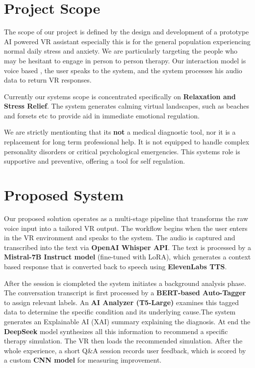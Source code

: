 \section{Project Scope}

The scope of our project is defined by the design and development of a prototype AI powered VR assistant especially this is for the general population experiencing normal daily stress and anxiety. We are particularly targeting the people who may be hesitant to engage in person to person therapy. Our interaction model is voice based , the user speaks to the system, and the system processes his audio data to return VR responses.

Currently our systems scope is concentrated specifically on \textbf{Relaxation and Stress Relief}. The system generates calming virtual landscapes, such as beaches and forsets etc to provide aid in immediate emotional regulation.

We are strictly mentionting that its \textbf{not} a medical diagnostic tool, nor it is a replacement for long term professional help. It is not equipped to handle complex personality disorders or critical psychological emergencies. This systems role is supportive and preventive, offering a tool for self regulation.

\section{Proposed System}

Our proposed solution operates as a multi-stage pipeline that transforms the raw voice input into a tailored VR output. The workflow begins when the user enters in the VR environment and speaks to the system. The audio is captured and transcribed into the text via  \textbf{OpenAI Whisper API}. The text is processed by a \textbf{Mistral-7B Instruct model} (fine-tuned with LoRA), which generates a context based response that is converted back to speech using \textbf{ElevenLabs TTS}.

After the session is ciompleted the system initiates a background analysis phase. The conversation transcript is first processed by a \textbf{BERT-based Auto-Tagger} to assign relevant labels. An \textbf{AI Analyzer (T5-Large)} examines this tagged data to determine the specific condition and its underlying cause.The system generates an Explainable AI (XAI) summary explaining the diagnosis. At end the \textbf{DeepSeek} model synthesizes all this information to recommend a specific therapy simulation. The VR then loads the recommended simulation. After the whole experience, a short Q\&A session records user feedback, which is scored by a custom \textbf{CNN model} for measuring improvement.

